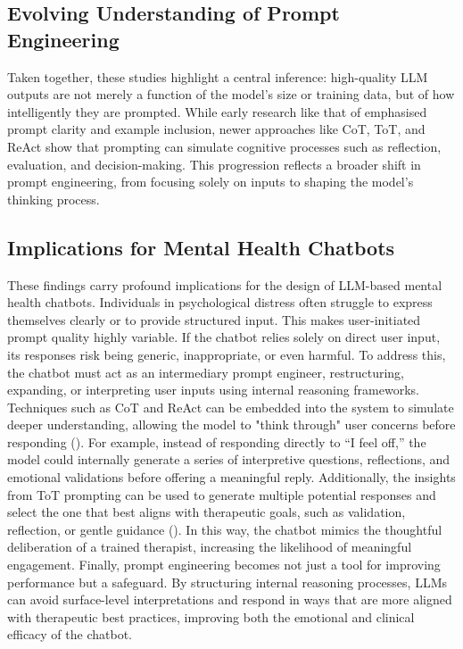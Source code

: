 \subsection{Evolving Understanding of Prompt Engineering} 
Taken together, these studies highlight a central inference: high-quality LLM outputs are not merely a function of the model’s size or training data, but of how intelligently they are prompted. While early research like that of \cite{garg2021transformers, brown2020language} emphasised prompt clarity and example inclusion, newer approaches like CoT, ToT, and ReAct show that prompting can simulate cognitive processes such as reflection, evaluation, and decision-making. This progression reflects a broader shift in prompt engineering, from focusing solely on inputs to shaping the model’s thinking process.


\subsection{Implications for Mental Health Chatbots}
These findings carry profound implications for the design of LLM-based mental health chatbots. Individuals in psychological distress often struggle to express themselves clearly or to provide structured input. This makes user-initiated prompt quality highly variable. If the chatbot relies solely on direct user input, its responses risk being generic, inappropriate, or even harmful.
To address this, the chatbot must act as an intermediary prompt engineer, restructuring, expanding, or interpreting user inputs using internal reasoning frameworks. Techniques such as CoT and ReAct can be embedded into the system to simulate deeper understanding, allowing the model to "think through" user concerns before responding (\cite{wang2022self, yao2022react}). For example, instead of responding directly to “I feel off,” the model could internally generate a series of interpretive questions, reflections, and emotional validations before offering a meaningful reply.
Additionally, the insights from ToT prompting can be used to generate multiple potential responses and select the one that best aligns with therapeutic goals, such as validation, reflection, or gentle guidance (\cite{yao2023tree}). In this way, the chatbot mimics the thoughtful deliberation of a trained therapist, increasing the likelihood of meaningful engagement.
Finally, prompt engineering becomes not just a tool for improving performance but a safeguard. By structuring internal reasoning processes, LLMs can avoid surface-level interpretations and respond in ways that are more aligned with therapeutic best practices, improving both the emotional and clinical efficacy of the chatbot.